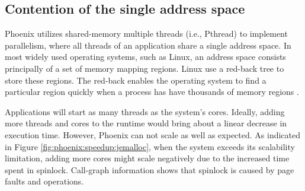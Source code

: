 




\subsection{Contention of the single address space}
Phoenix utilizes shared-memory multiple threads (i.e., Pthread) to implement parallelism, where all threads of an application share a single address space.
In most widely used operating systems, such as Linux, an address space consists principally of a set of memory mapping regions.
Linux use a red-back tree to store these regions. 
The red-back enables the operating system to find a particular region quickly when a process has have thousands of memory regions \cite{linux}.

Applications will start as many threads as the system's cores.
Ideally, adding more threads and cores to the runtime would bring about a linear decrease in execution time.
However, Phoenix can not scale as well as expected.
As indicated in Figure \ref{fig:phoenix:speedup:jemalloc}, when the system exceeds its scalability limitation, adding more cores might scale negatively due to the increased time spent in spinlock.
Call-graph information shows that spinlock is caused by page faults and  operations.

